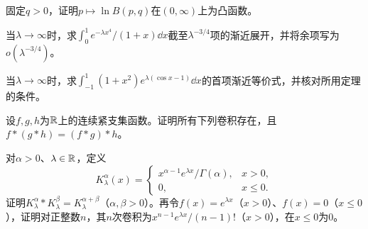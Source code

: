 固定$q>0$，证明$p\mapsto\ln B(p,q)$在$(0,\infty)$上为凸函数。

当$\lambda\to\infty$时，求$\int_0^1 e^{-\lambda x^4}/(1+x)\dd x$截至$\lambda^{-3/4}$项的渐近展开，并将余项写为$o(\lambda^{-3/4})$。

当$\lambda\to\infty$时，求$\int_{-1}^1(1+x^2)e^{\lambda(\cos x-1)}\dd x$的首项渐近等价式，并核对所用定理的条件。

设$f,g,h$为$\mathbb R$上的连续紧支集函数。证明所有下列卷积存在，且$f*(g*h)=(f*g)*h$。

对$\alpha>0$、$\lambda\in\mathbb R$，定义
\[
 K_\lambda^\alpha(x)=\begin{cases}x^{\alpha-1}e^{\lambda x}/\Gamma(\alpha),&x>0,\\0,&x\le0.\end{cases}
\]
证明$K_\lambda^\alpha*K_\lambda^\beta=K_\lambda^{\alpha+\beta}$（$\alpha,\beta>0$）。再令$f(x)=e^{\lambda x}$（$x>0$）、$f(x)=0$（$x\le0$），证明对正整数$n$，其$n$次卷积为$x^{n-1}e^{\lambda x}/(n-1)!$（$x>0$），在$x\le0$为$0$。



